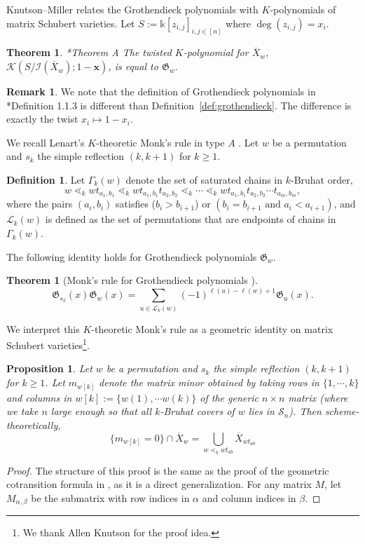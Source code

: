 \documentclass[12pt,reqno]{amsart}
\newtheorem{theorem}[lemma]{Theorem}
\newtheorem{prop}[lemma]{Proposition}
\theoremstyle{definition}
\newtheorem{definition}[lemma]{Definition}
\newtheorem{remark}[lemma]{Remark}
\renewcommand{\k}{\mathbb{k}}
\newcommand{\symm}{\mathcal{S}}
\newcommand{\G}{\mathfrak{G}}
\newcommand{\Lenart}{\mathcal{L}}
\begin{document}
{Knutson--Miller \cite{knutsonMiller} relates the Grothendieck polynomials with $K$-polynomials of matrix Schubert varieties. Let $S:=\k[z_{i,j}]_{i,j\in[n]}$ where $\deg(z_{i,j})=x_i$.

\begin{theorem}{\cite{knutsonMiller}*{Theorem A}} 
         The twisted $K$-polynomial for $\overline{X}_w$,
        $\mathcal{K}(S/\mathcal{I}(\overline{X}_w);1-\mathbf{x})$, is equal to $\mathfrak{G}_w.$
\end{theorem}

\begin{remark}
    We note that the definition of Grothendieck polynomials in \cite{knutsonMiller}*{Definition 1.1.3} is different than Definition~\ref{def:grothendieck}. The difference is exactly the twist $x_i\mapsto 1-x_i$.
\end{remark}


We recall Lenart's $K$-theoretic Monk's rule in type $A$ \cite{lenart2003k}. Let $w$ be a permutation and $s_k$ the simple reflection $(k,k+1)$ for $k\ge 1$. 

\begin{definition}\label{def:L_k}
    Let $\Gamma_k(w)$ denote the set of saturated chains in $k$-Bruhat order,
\[
    w\lessdot_k wt_{a_1,b_1}\lessdot_k wt_{a_1,b_1}t_{a_2,b_2} \lessdot_k\cdots \lessdot_k wt_{a_1,b_1}t_{a_2,b_2}\cdots t_{a_m,b_m},
\]
where the pairs $(a_i,b_i)$ satisfies ($b_i>b_{i+1}$) or $(b_i=b_{i+1} \text{ and } a_i<a_{i+1})$, and $\Lenart_k(w)$ is defined as the set of permutations that are endpoints of chains in $\Gamma_k(w)$.
\end{definition}

The following identity holds for Grothendieck polynomials
$\G_w$.
\begin{theorem}[Monk's rule for Grothendieck polynomials \cite{lenart2003k}]
\label{thm:lenart-K-monk}
\[\G_{s_k}(x)\G_w(x)=\sum_{u\in \Lenart_k(w)} (-1)^{\ell(u)-\ell(w)+1}\G_u(x).\] 
\end{theorem}

 We interpret this $K$-theoretic Monk's rule as a geometric identity on matrix Schubert varieties\footnote{We thank Allen Knutson for the proof idea.}.
\begin{prop}
    \label{prop:geometric-monk}
    Let $w$ be a permutation and $s_k$ the simple reflection $(k,k+1)$ for $k\ge 1$. Let $m_{w[k]}$ denote the matrix minor obtained by taking rows in $\{1,\cdots,k\}$ and columns in $w[k]:=\{w(1),\cdots w(k)\}$ of the generic $n\times n$ matrix (where we take $n$ large enough so that all $k$-Bruhat covers of $w$ lies in $\symm_n$). Then scheme-theoretically,
    \[\{m_{w[k]} = 0\}\cap \overline{X}_w=\bigcup_{w\lessdot_k wt_{ab}} \overline{X}_{wt_{ab}}\]
\end{prop}
\begin{proof}
    The structure of this proof is the same as the proof of the geometric cotransition formula in \cite{knutson2022schubert}, as it is a direct generalization.
    For any matrix $M$, let $M_{\alpha,\beta}$ be the submatrix with row indices in $\alpha$ and column indices in $\beta$.


\end{proof}}
\end{document}
